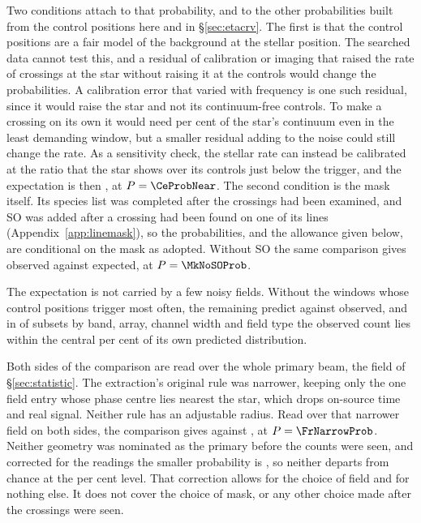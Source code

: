 Two conditions attach to that probability, and to the other probabilities
built from the control positions here and in \S\ref{sec:etacrv}. The first
is that the control positions are a fair model of the background at the
stellar position. The searched data cannot test this, and a residual of
calibration or imaging that raised the rate of crossings at the star without
raising it at the controls would change the probabilities. A calibration
error that varied with frequency is one such residual, since it would raise
the star and not its continuum-free controls. To make a crossing on its own
it would need \CyEpsMinPct{} per cent of the star's continuum even in the
least demanding window, but a smaller residual adding to the noise could
still change the rate. As a sensitivity
check, the stellar rate can instead be calibrated at the ratio \CeNear{}
that the star shows over its controls just below the trigger, and the
expectation is then \CeExpNear{}, at $P=\CeProbNear$. The second condition
is the mask itself. Its species list was completed after the crossings had
been examined, and SO was added after a crossing had been found on one of its
lines (Appendix~\ref{app:linemask}), so the probabilities, and the allowance
given below, are conditional on the mask as adopted. Without SO the same
comparison gives \MkNoSOObs{} observed against \MkNoSOExp{} expected, at
$P=\MkNoSOProb$.

The expectation is not carried by a few noisy fields. Without the
\BgTopNWord{} windows whose control positions trigger most often, the
remaining \BgDropTenNWin{} predict \BgDropTenExp{} against \BgDropTenObs{}
observed, and in \BgNConfIn{} of \BgNConf{} subsets by band, array, channel
width and field type the observed count lies within the central \CeCovPct{}
per cent of its own predicted distribution.

Both sides of the comparison are read over the whole primary beam, the field
of \S\ref{sec:statistic}. The extraction's original rule was narrower,
keeping only the one field entry whose phase centre lies nearest the star,
which drops on-source time and real signal. Neither rule has an adjustable
radius. Read over that narrower field on both sides, the comparison gives
\FrNarrowObs{} against \FrNarrowExp{}, at $P=\FrNarrowProb$. Neither geometry
was nominated as the primary before the counts were seen, and corrected for
the \FrNRead{} readings the smaller probability is \FrTwoTrialP, so neither
departs from chance at the \CeAlphaPct{} per cent level. That correction
allows for the choice of field and for nothing else. It does not cover the
choice of mask, or any other choice made after the crossings were seen.

